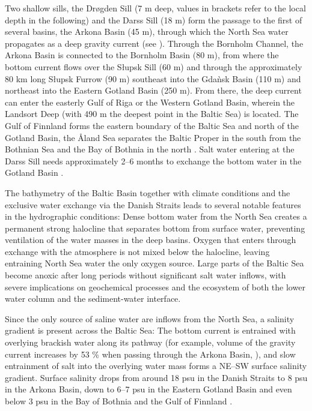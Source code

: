 Two shallow sills, the Dr\o gden Sill (7 
m deep, 
values in brackets refer to the local depth in the following) and the Darss Sill 
(18 m) form the passage to the first of several basins, the Arkona Basin (45 m), 
through which the North Sea water propagates as a deep gravity current 
(see ). Through 
the Bornholm Channel, the Arkona Basin is connected to the Bornholm Basin (80 
m), from where the bottom current flows over the S\l upsk Sill (60 m) and 
through the approximately 80 km long S\l upsk Furrow (90 m) southeast into the 
Gda\`{n}sk Basin (110 m) and northeast into the Eastern Gotland Basin (250 m). 
From there, the deep current can enter the easterly Gulf of Riga or the Western 
Gotland Basin, wherein the Landsort Deep (with 490 m the deepest point in the 
Baltic Sea) is located. The Gulf of Finnland forms the eastern boundary of the 
Baltic Sea and north of the Gotland Basin, the \r{A}land Sea separates the 
Baltic Proper in the south from the Bothnian Sea and the Bay of Bothnia in the 
north \citep[][]{reissmann2009}. Salt water entering at the Darss Sill needs 
approximately 2--6 months to exchange the bottom water in the Gotland Basin 
\citep[][]{balticsea}.

The bathymetry of the Baltic Basin together with climate conditions and the 
exclusive water exchange via the Danish Straits leads to several notable 
features in the hydrographic conditions: Dense bottom water from the North Sea 
creates a permanent strong halocline that separates bottom from surface water, 
preventing ventilation of the water masses in the deep basins. Oxygen that 
enters through exchange with the atmosphere is not mixed below the halocline, 
leaving entraining North Sea water the only oxygen source. Large parts of the 
Baltic Sea become anoxic after long periods without significant salt water 
inflows, with severe implications on geochemical processes and the ecosystem of 
both the lower water column and the sediment-water interface. 

Since the only source of saline water are inflows from the North Sea, a 
salinity gradient is present across the Baltic Sea: The bottom current is 
entrained with overlying brackish water along its pathway (for example, volume 
of the gravity current increases by 53 \% when passing through the Arkona Basin, 
\citep[see][]{reissmann2009}), and slow entrainment of salt into the overlying 
water mass forms a NE--SW surface salinity gradient. Surface salinity drops from 
around 18 psu in the Danish Straits to 8 psu in the Arkona Basin, down to 6--7 
psu in the Eastern Gotland Basin and even below 3 psu in the Bay of Bothnia and 
the Gulf of Finnland \citep[][]{balticsea}.

